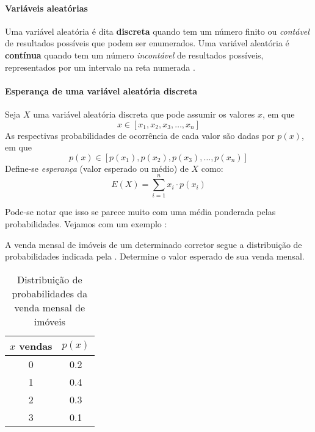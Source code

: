\paragraph{Variáveis aleatórias}
Uma variável aleatória é dita \textbf{discreta} quando tem um número finito
ou \emph{contável} de resultados possíveis que podem ser enumerados. Uma
variável aleatória é \textbf{contínua} quando tem um número
\emph{incontável} de resultados possíveis, representados por um intervalo
na reta numerada \cite{larson}.

\paragraph{Esperança de uma variável aleatória discreta}
Seja $X$ uma variável aleatória discreta que pode assumir os valores $x$,
em que
\[
    x \in [x_1, x_2, x_3, \ldots, x_n]
\]
As respectivas probabilidades de ocorrência de cada valor são dadas por
$p(x)$, em que
\[
    p(x) \in [p(x_1), p(x_2), p(x_3), \ldots, p(x_n)]
\]
Define-se \emph{esperança} (valor esperado ou médio) de $X$ como:
\begin{equation}
E(X) = \sum_{i=1}^{n} x_i \cdot p(x_i)
\label{eq:esperanca-discreta}
\end{equation}

Pode-se notar que isso se parece muito com uma média ponderada pelas
probabilidades. Vejamos com um exemplo \parencite[p~.307]{favero}:

\begin{eg}
A venda mensal de imóveis de um determinado corretor segue a distribuição
de probabilidades indicada pela .
Determine o valor esperado de sua venda mensal.
\end{eg}

\begin{table}
    \centering
    \begin{tabular}{cc}
        \toprule
        $x$ vendas & $p(x)$ \\
        \midrule
        0 & 0.2 \\
        1 & 0.4 \\
        2 & 0.3 \\
        3 & 0.1 \\
        \bottomrule
    \end{tabular}
    \caption{Distribuição de probabilidades da venda mensal de imóveis}
    \label{tab:dist-venda-imoveis}
\end{table}

